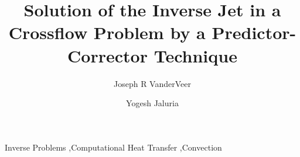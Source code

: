 \documentclass[preprint,12pt]{elsarticle}
\begin{document}
\begin{frontmatter}
\title{Solution of the Inverse Jet in a Crossflow Problem by a Predictor-Corrector Technique}

\author{Joseph R VanderVeer}
\author{Yogesh Jaluria}

\address{Department of Mechanical and Aerospace Engineering: Rutgers University, 98 Brett Rd, Piscataway NJ, 08854}



\begin{abstract}



\end{abstract}
\begin{keyword}
Inverse Problems \sep Computational Heat Transfer \sep Convection
\end{keyword}
\end{frontmatter}


\newlength\figureheight 
\newlength\figurewidth 
	
	
	
\end{document}
